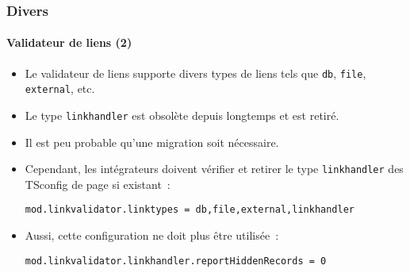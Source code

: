 %

\begin{frame}[fragile]
	\frametitle{Divers}
	\framesubtitle{Validateur de liens (2)}


	\begin{itemize}
		\item Le validateur de liens supporte divers types de liens tels que
			\small\texttt{db}\normalsize, \small\texttt{file}\normalsize,
			\small\texttt{external}\normalsize, etc.
		\item Le type \small\texttt{linkhandler}\normalsize
			est obsolète depuis longtemps et est retiré.
		\item Il est peu probable qu'une migration soit nécessaire.
		\item Cependant, les intégrateurs doivent vérifier et retirer le type \texttt{linkhandler}
			des TSconfig de page si existant~:
\begin{lstlisting}
mod.linkvalidator.linktypes = db,file,external,linkhandler
\end{lstlisting}

		\item Aussi, cette configuration ne doit plus être utilisée~:
\begin{lstlisting}
mod.linkvalidator.linkhandler.reportHiddenRecords = 0
\end{lstlisting}

	\end{itemize}

\end{frame}


